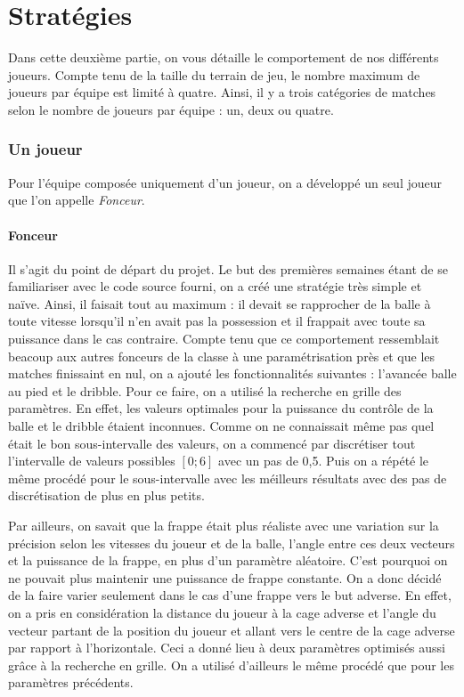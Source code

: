 \documentclass[12pt,a4paper]{article}
\begin{document}
\newpage

\part{Strat\'egies}
Dans cette deuxi\`eme partie, on vous d\'etaille le comportement de nos 
diff\'erents joueurs.
Compte tenu de la taille du terrain de jeu, le nombre maximum de joueurs par 
\'equipe est limit\'e \`a quatre. 
Ainsi, il y a trois cat\'egories de matches 
selon le nombre de joueurs par \'equipe : un, deux ou quatre.

\section{Un joueur}
Pour l'\'equipe compos\'ee uniquement d'un joueur, on a d\'evelopp\'e un seul 
joueur que l'on appelle {\itshape Fonceur}. 

\subsection*{Fonceur}
Il s'agit du point de d\'epart du projet. Le but des premi\`eres semaines 
\'etant de se familiariser avec le code source fourni, on a cr\'e\'e une 
strat\'egie tr\`es simple et na\"ive. 
Ainsi, il faisait tout au maximum : il devait se rapprocher de la balle \`a 
toute vitesse lorsqu'il n'en avait pas la possession et il 
frappait avec toute sa 
puissance dans le cas contraire.
Compte tenu que ce comportement ressemblait beacoup aux autres fonceurs de la 
classe \`a une param\'etrisation pr\`es et que les matches finissaint en nul, on 
a ajout\'e les fonctionnalit\'es suivantes : l'avanc\'ee balle au pied et le 
dribble.
Pour ce faire, on a utilis\'e la recherche en grille des param\`etres. En 
effet, les valeurs optimales pour la puissance du contr\^ole de la balle et 
le dribble \'etaient inconnues.
Comme on ne connaissait m\^eme pas quel \'etait le bon sous-intervalle des 
valeurs, on a commenc\'e par discr\'etiser tout l'intervalle 
de valeurs possibles $\left[0;6\right]$ avec un pas de 0,5. Puis on a 
r\'ep\'et\'e le m\^eme proc\'ed\'e pour le sous-intervalle avec les m\'eilleurs 
r\'esultats avec des pas de discr\'etisation de plus en plus petits.

Par ailleurs, on savait que la frappe \'etait plus r\'ealiste avec une 
variation sur la pr\'ecision selon les vitesses du joueur et de la balle, 
l'angle entre ces deux vecteurs et la puissance de la frappe, en plus d'un 
param\`etre al\'eatoire. C'est pourquoi on ne pouvait plus maintenir 
une puissance de frappe constante. On a donc d\'ecid\'e de la faire varier 
seulement dans le cas d'une frappe vers le but adverse. En effet, on a pris en 
consid\'eration la distance du joueur \`a la cage adverse et l'angle du vecteur 
partant de la position du joueur et allant vers le centre de la cage adverse 
par rapport \`a l'horizontale. Ceci a donn\'e lieu \`a deux param\`etres 
optimis\'es aussi gr\^ace \`a la recherche en grille. On a utilis\'e d'ailleurs 
le m\^eme proc\'ed\'e que pour les param\`etres pr\'ec\'edents.
\end{document}
